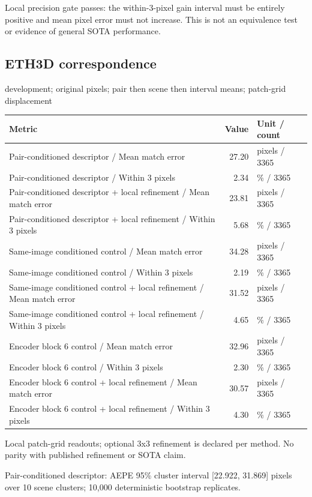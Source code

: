 \documentclass[10pt]{article}
\begin{document}
Local precision gate passes: the within-3-pixel gain interval must be entirely positive and mean pixel error must not increase. This is not an equivalence test or evidence of general SOTA performance.

\subsection{ETH3D correspondence}
development; original pixels; pair then scene then interval means; patch-grid displacement
\begin{center}\begin{tabular}{p{.57\linewidth}rp{.23\linewidth}}\toprule Metric & Value & Unit / count \\ \midrule
Pair-conditioned descriptor  /  Mean match error & 27.20 & pixels / 3365 \\
Pair-conditioned descriptor  /  Within 3 pixels & 2.34 & \% / 3365 \\
Pair-conditioned descriptor + local refinement  /  Mean match error & 23.81 & pixels / 3365 \\
Pair-conditioned descriptor + local refinement  /  Within 3 pixels & 5.68 & \% / 3365 \\
Same-image conditioned control  /  Mean match error & 34.28 & pixels / 3365 \\
Same-image conditioned control  /  Within 3 pixels & 2.19 & \% / 3365 \\
Same-image conditioned control + local refinement  /  Mean match error & 31.52 & pixels / 3365 \\
Same-image conditioned control + local refinement  /  Within 3 pixels & 4.65 & \% / 3365 \\
Encoder block 6 control  /  Mean match error & 32.96 & pixels / 3365 \\
Encoder block 6 control  /  Within 3 pixels & 2.30 & \% / 3365 \\
Encoder block 6 control + local refinement  /  Mean match error & 30.57 & pixels / 3365 \\
Encoder block 6 control + local refinement  /  Within 3 pixels & 4.30 & \% / 3365 \\
\bottomrule\end{tabular}\end{center}
Local patch-grid readouts; optional 3x3 refinement is declared per method. No parity with published refinement or SOTA claim.

Pair-conditioned descriptor: AEPE 95\% cluster interval [22.922, 31.869] pixels over 10 scene clusters; 10,000 deterministic bootstrap replicates.
\end{document}
